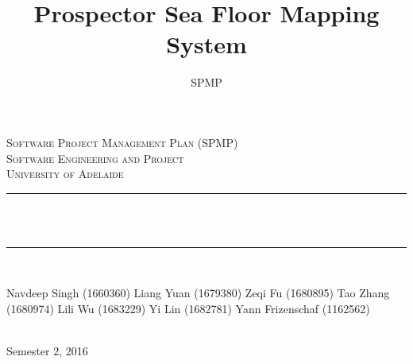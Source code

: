 \documentclass[12pt]{article}
\title{Prospector Sea Floor Mapping System}
\author{SPMP}
\makeatletter
\let\thetitle\@title
\makeatother
\begin{document}

\begin{titlepage}
	\centering
    \vspace*{0.0 cm}
    \textsc{\LARGE Software Project Management Plan (SPMP)}\\[2.0 cm]
	\textsc{\Large Software Engineering and Project}\\[0.5 cm]			
	\textsc{\large University of Adelaide}\\[0.5 cm]
	\rule{\linewidth}{0.2 mm} \\[0.4 cm]
	{ \huge \bfseries \thetitle}\\
	\rule{\linewidth}{0.2 mm} \\[1.5 cm]
	
	\begin{minipage}{0.4\textwidth}
		\begin{center} \large
			Navdeep Singh (1660360)\linebreak
			Liang Yuan (1679380)\linebreak
			Zeqi Fu (1680895)\linebreak
			Tao Zhang (1680974)\linebreak
			Lili Wu (1683229)\linebreak
			Yi Lin (1682781)\linebreak
            Yann Frizenschaf (1162562)\linebreak
			\end{center}
	\end{minipage}\\[2 cm]
	
	{\large Semester 2, 2016}\\[2 cm]
 
	\vfill
	
\end{titlepage}
\end{document}
